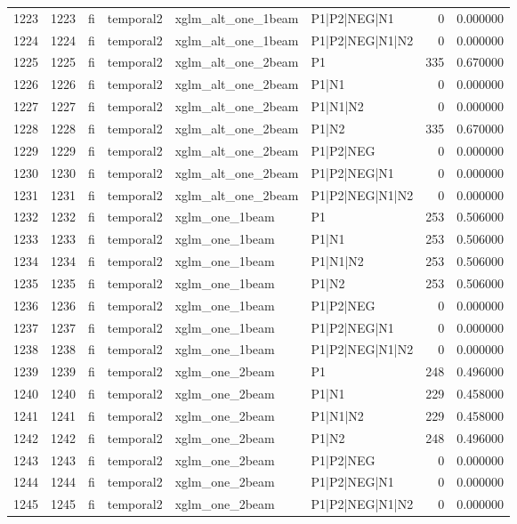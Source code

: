 \begin{tabular}{lrllllrr}
1223 & 1223 & fi & temporal2 & xglm_alt_one_1beam & P1|P2|NEG|N1 & 0 & 0.000000 \\
1224 & 1224 & fi & temporal2 & xglm_alt_one_1beam & P1|P2|NEG|N1|N2 & 0 & 0.000000 \\
1225 & 1225 & fi & temporal2 & xglm_alt_one_2beam & P1 & 335 & 0.670000 \\
1226 & 1226 & fi & temporal2 & xglm_alt_one_2beam & P1|N1 & 0 & 0.000000 \\
1227 & 1227 & fi & temporal2 & xglm_alt_one_2beam & P1|N1|N2 & 0 & 0.000000 \\
1228 & 1228 & fi & temporal2 & xglm_alt_one_2beam & P1|N2 & 335 & 0.670000 \\
1229 & 1229 & fi & temporal2 & xglm_alt_one_2beam & P1|P2|NEG & 0 & 0.000000 \\
1230 & 1230 & fi & temporal2 & xglm_alt_one_2beam & P1|P2|NEG|N1 & 0 & 0.000000 \\
1231 & 1231 & fi & temporal2 & xglm_alt_one_2beam & P1|P2|NEG|N1|N2 & 0 & 0.000000 \\
1232 & 1232 & fi & temporal2 & xglm_one_1beam & P1 & 253 & 0.506000 \\
1233 & 1233 & fi & temporal2 & xglm_one_1beam & P1|N1 & 253 & 0.506000 \\
1234 & 1234 & fi & temporal2 & xglm_one_1beam & P1|N1|N2 & 253 & 0.506000 \\
1235 & 1235 & fi & temporal2 & xglm_one_1beam & P1|N2 & 253 & 0.506000 \\
1236 & 1236 & fi & temporal2 & xglm_one_1beam & P1|P2|NEG & 0 & 0.000000 \\
1237 & 1237 & fi & temporal2 & xglm_one_1beam & P1|P2|NEG|N1 & 0 & 0.000000 \\
1238 & 1238 & fi & temporal2 & xglm_one_1beam & P1|P2|NEG|N1|N2 & 0 & 0.000000 \\
1239 & 1239 & fi & temporal2 & xglm_one_2beam & P1 & 248 & 0.496000 \\
1240 & 1240 & fi & temporal2 & xglm_one_2beam & P1|N1 & 229 & 0.458000 \\
1241 & 1241 & fi & temporal2 & xglm_one_2beam & P1|N1|N2 & 229 & 0.458000 \\
1242 & 1242 & fi & temporal2 & xglm_one_2beam & P1|N2 & 248 & 0.496000 \\
1243 & 1243 & fi & temporal2 & xglm_one_2beam & P1|P2|NEG & 0 & 0.000000 \\
1244 & 1244 & fi & temporal2 & xglm_one_2beam & P1|P2|NEG|N1 & 0 & 0.000000 \\
1245 & 1245 & fi & temporal2 & xglm_one_2beam & P1|P2|NEG|N1|N2 & 0 & 0.000000 \\

\end{tabular}
